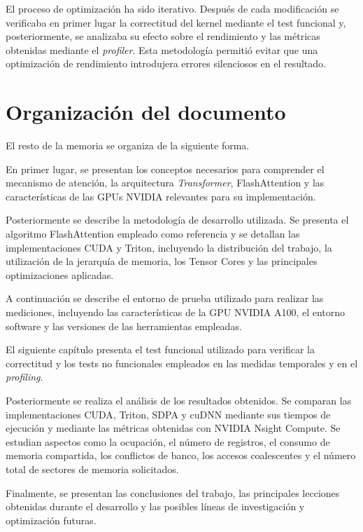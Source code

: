 El proceso de optimización ha sido iterativo. Después de cada modificación se verificaba en primer lugar la correctitud del kernel mediante el test funcional y, posteriormente, se analizaba su efecto sobre el rendimiento y las métricas obtenidas mediante el \textit{profiler}. Esta metodología permitió evitar que una optimización de rendimiento introdujera errores silenciosos en el resultado.

\section{Organización del documento}

El resto de la memoria se organiza de la siguiente forma.

En primer lugar, se presentan los conceptos necesarios para comprender el mecanismo de atención, la arquitectura \textit{Transformer}, FlashAttention y las características de las GPUs NVIDIA relevantes para su implementación.

Posteriormente se describe la metodología de desarrollo utilizada. Se presenta el algoritmo FlashAttention empleado como referencia y se detallan las implementaciones CUDA y Triton, incluyendo la distribución del trabajo, la utilización de la jerarquía de memoria, los Tensor Cores y las principales optimizaciones aplicadas.

A continuación se describe el entorno de prueba utilizado para realizar las mediciones, incluyendo las características de la GPU NVIDIA A100, el entorno software y las versiones de las herramientas empleadas.

El siguiente capítulo presenta el test funcional utilizado para verificar la correctitud y los tests no funcionales empleados en las medidas temporales y en el \textit{profiling}.

Posteriormente se realiza el análisis de los resultados obtenidos. Se comparan las implementaciones CUDA, Triton, SDPA y cuDNN mediante sus tiempos de ejecución y mediante las métricas obtenidas con NVIDIA Nsight Compute. Se estudian aspectos como la ocupación, el número de registros, el consumo de memoria compartida, los conflictos de banco, los accesos coalescentes y el número total de sectores de memoria solicitados.

Finalmente, se presentan las conclusiones del trabajo, las principales lecciones obtenidas durante el desarrollo y las posibles líneas de investigación y optimización futuras.
